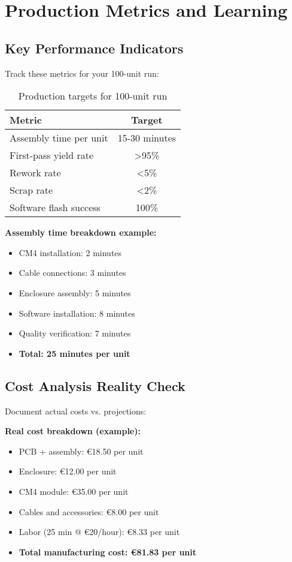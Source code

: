 \section{Production Metrics and Learning}

\subsection{Key Performance Indicators}

Track these metrics for your 100-unit run:

\begin{table}[h]
\centering
\begin{tabular}{|l|c|}
\hline
\textbf{Metric} & \textbf{Target} \\
\hline
Assembly time per unit & 15-30 minutes \\
First-pass yield rate & >95\% \\
Rework rate & <5\% \\
Scrap rate & <2\% \\
Software flash success & 100\% \\
\hline
\end{tabular}
\caption{Production targets for 100-unit run}
\end{table}

\textbf{Assembly time breakdown example:}
\begin{itemize}
\item CM4 installation: 2 minutes
\item Cable connections: 3 minutes
\item Enclosure assembly: 5 minutes
\item Software installation: 8 minutes
\item Quality verification: 7 minutes
\item \textbf{Total: 25 minutes per unit}
\end{itemize}

\subsection{Cost Analysis Reality Check}

Document actual costs vs. projections:

\textbf{Real cost breakdown (example):}
\begin{itemize}
\item PCB + assembly: €18.50 per unit
\item Enclosure: €12.00 per unit
\item CM4 module: €35.00 per unit
\item Cables and accessories: €8.00 per unit
\item Labor (25 min @ €20/hour): €8.33 per unit
\item \textbf{Total manufacturing cost: €81.83 per unit}
\end{itemize}

